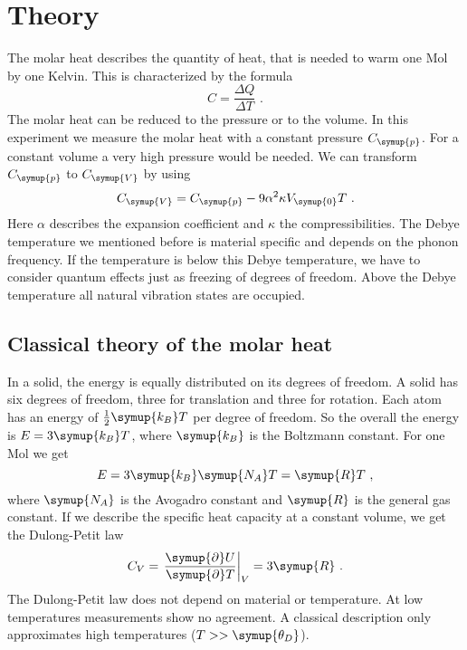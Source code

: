 \section{Theory}
\label{sec:theory}

The molar heat describes the quantity of heat, that is needed to warm one Mol by one Kelvin. This is characterized by the formula 
\begin{equation*}
    C = \frac{\Delta Q}{\Delta T} \,\, . 
\end{equation*}
The molar heat can be reduced to the pressure or to the volume. In this experiment we measure the molar heat with a constant pressure $C_{\symup{p}}$. 
For a constant volume a very high pressure would be needed. We can transform $C_{\symup{p}}$ to $C_{\symup{V}}$ by using 
\begin{equation*}
    C_{\symup{V}} = C_{\symup{p}} - 9{\alpha}^2\kappa V_{\symup{0}}T \,\, .
\end{equation*}
Here $\alpha$ describes the expansion coefficient and $\kappa$ the compressibilities.
The Debye temperature we mentioned before is material specific and depends on the phonon frequency. If the temperature is below this Debye temperature,
we have to consider quantum effects just as freezing of degrees of freedom. Above the Debye temperature all natural vibration states are occupied. 

\subsection{Classical theory of the molar heat}
\label{sec:classic}
In a solid, the energy is equally distributed on its degrees of freedom. A solid has six degrees of freedom, three for translation and three for rotation.
Each atom has an energy of $\frac{1}{2}\symup{k_B}T$ per degree of freedom. So the overall the energy is $E=3\symup{k_B}T$, where $\symup{k_B}$ 
is the Boltzmann constant. For one Mol we get 
\begin{equation*}
    E = 3\symup{k_B}\symup{N_A}T = \symup{R}T \,\, ,
\end{equation*}
where $\symup{N_A}$ is the Avogadro constant and $\symup{R}$ is the general gas constant. If we describe the specific heat capacity at a constant volume, 
we get the Dulong-Petit law
\begin{equation*}
    C_V = \left.\frac{\symup{\partial}U}{\symup{\partial}T}\right|_V=3 \symup{R} \,\, .
\end{equation*}
The Dulong-Petit law does not depend on material or temperature. At low temperatures measurements show no agreement. A classical description 
only approximates high temperatures ($T>> \symup{\theta_D}$).

